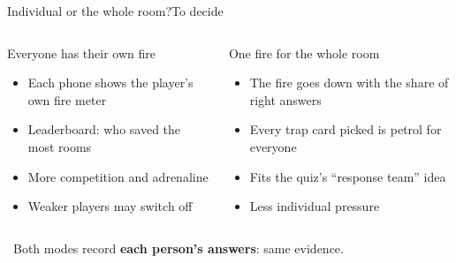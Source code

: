 \documentclass[aspectratio=169,11pt,t]{beamer}
\newcommand\cardtitle[3]{%
  \iconbadge[8mm]{#1}{#2}\hspace{2mm}\begin{minipage}[c]{\dimexpr\linewidth-11mm\relax}\raggedright\headfont\color{navy}#3\end{minipage}}
\begin{document}
\begin{frame}{Individual or the whole room?}{To decide}
  \vspace{6mm}
  \begin{columns}[T,onlytextwidth]
    \begin{card}[equal height group=modes, top=2.5mm, bottom=2mm]
      \cardtitle{navy}{\faUser}{Everyone has their own fire}\par\vspace{2mm}
      \begin{itemize}\scriptsize\setlength\itemsep{0pt}
        \item Each phone shows the player's own fire meter
        \item Leaderboard: who saved the most rooms
        \item[\textcolor{good}{\faPlus}] More competition and adrenaline
        \item[\textcolor{alert}{\faMinus}] Weaker players may switch off
      \end{itemize}
    \end{card}
    \begin{card}[equal height group=modes, top=2.5mm, bottom=2mm]
      \cardtitle{alert}{\faUsers}{One fire for the whole room}\par\vspace{2mm}
      \begin{itemize}\scriptsize\setlength\itemsep{0pt}
        \item The fire goes down with the share of right answers
        \item Every trap card picked is petrol for everyone
        \item[\textcolor{good}{\faPlus}] Fits the quiz's “response team” idea
        \item[\textcolor{alert}{\faMinus}] Less individual pressure
      \end{itemize}
    \end{card}
  \end{columns}
  \vspace{3mm}\centering
  {\scriptsize\color{muted}\faInfoCircle\ Both modes record \textbf{each person's answers}: same evidence.}
\end{frame}
\end{document}
